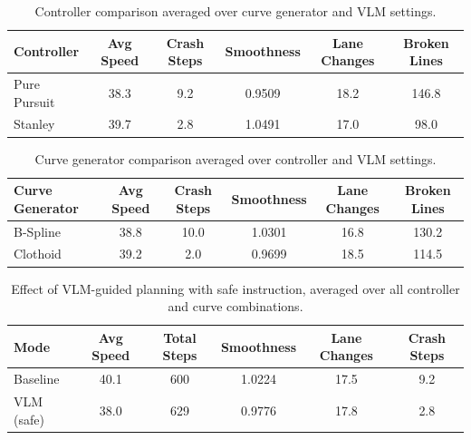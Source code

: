 \begin{table}[htbp]
\centering
\caption{Controller comparison averaged over curve generator and VLM settings.}
\label{tab:controller_comparison}
\begin{tabular}{l c c c c c}
\toprule
Controller & Avg Speed & Crash Steps & Smoothness & Lane Changes & Broken Lines \\
\midrule
Pure Pursuit & 38.3 & 9.2 & 0.9509 & 18.2 & 146.8 \\
Stanley & 39.7 & 2.8 & 1.0491 & 17.0 & 98.0 \\
\bottomrule
\end{tabular}
\end{table}

\begin{table}[htbp]
\centering
\caption{Curve generator comparison averaged over controller and VLM settings.}
\label{tab:curve_comparison}
\begin{tabular}{l c c c c c}
\toprule
Curve Generator & Avg Speed & Crash Steps & Smoothness & Lane Changes & Broken Lines \\
\midrule
B-Spline & 38.8 & 10.0 & 1.0301 & 16.8 & 130.2 \\
Clothoid & 39.2 & 2.0 & 0.9699 & 18.5 & 114.5 \\
\bottomrule
\end{tabular}
\end{table}

\begin{table}[htbp]
\centering
\caption{Effect of VLM-guided planning with safe instruction, averaged over all controller and curve combinations.}
\label{tab:vlm_effect}
\begin{tabular}{l c c c c c}
\toprule
Mode & Avg Speed & Total Steps & Smoothness & Lane Changes & Crash Steps \\
\midrule
Baseline & 40.1 & 600 & 1.0224 & 17.5 & 9.2 \\
VLM (safe) & 38.0 & 629 & 0.9776 & 17.8 & 2.8 \\
\bottomrule
\end{tabular}
\end{table}

